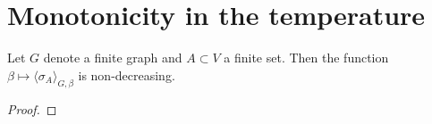 \section{Monotonicity in the temperature}

\begin{theorem}
    Let $G$ denote a finite graph and $A\subset V$ a finite set.
    Then the function $\beta\mapsto\langle\sigma_A\rangle_{G,\beta}$
    is non-decreasing.
\end{theorem}

\begin{proof}
    
\end{proof}

